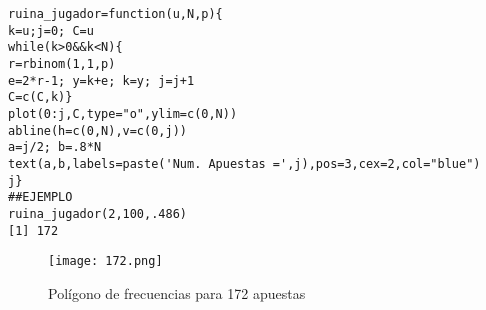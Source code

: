 \documentclass[letterpaper, 10 pt, conference]{ieeeconf}  %
\begin{document}
\begin{verbatim}
ruina_jugador=function(u,N,p){
k=u;j=0; C=u
while(k>0&&k<N){
r=rbinom(1,1,p)
e=2*r-1; y=k+e; k=y; j=j+1
C=c(C,k)}
plot(0:j,C,type="o",ylim=c(0,N))
abline(h=c(0,N),v=c(0,j))
a=j/2; b=.8*N
text(a,b,labels=paste('Num. Apuestas =',j),pos=3,cex=2,col="blue")
j}
##EJEMPLO
ruina_jugador(2,100,.486)
[1] 172
\end{verbatim}
\begin{figure}
    \centering
    \texttt{[image: 172.png]}
    \caption{Polígono de frecuencias para 172 apuestas}
    \label{fig:my_label}
\end{figure}



















\begin{itemize}

\end{itemize}








\end{document}
